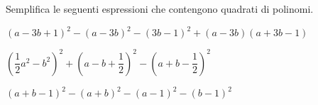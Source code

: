 \begin{esercizio}
 \label{ese:11.15}
Semplifica le seguenti espressioni che contengono quadrati di polinomi.

\begin{enumeratea}
 \item \((a-3b+1)^{2}-(a-3b)^{2}-(3b-1)^{2}+(a-3b)(a+3b-1)\)
\item 
\(\left(\dfrac{1}{2}a^{2}-b^{2}\right)^{2}+\left(a-b+\dfrac{1}{2}\right)^{2}
-\left(a+b-\dfrac{1}{2}\right)^{2}\)
\item \((a+b-1)^{2}-(a+b)^{2}-(a-1)^{2}-(b-1)^{2}\)
\end{enumeratea}
\end{esercizio}

\subsubsection*{}


